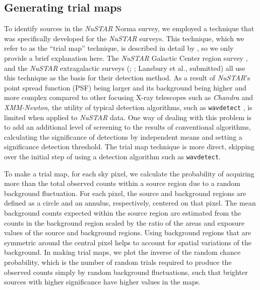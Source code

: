 \documentclass[iop,revtex4]{emulateapj}
\begin{document}
\subsection{Generating trial maps}
To identify sources in the \textit{NuSTAR} Norma survey, we employed a technique that was specifically developed for the \textit{NuSTAR} surveys.  This technique, which we refer to as the ``trial map'' technique, is described in detail by \citet{hong16}, so we only provide a brief explanation here.  The \textit{NuSTAR} Galactic Center region survey \citep{hong16}, and the \textit{NuSTAR} extragalactic surveys (\citealt{civano15}; \citealt{mullaney15}; Lansbury et al., submitted) all use this technique as the basis for their detection method.    
As a result of \textit{NuSTAR}'s point spread function (PSF) being larger and its background being higher and more complex compared to other focusing X-ray telescopes such as \textit{Chandra} and \textit{XMM-Newton}, the utility of typical detection algorithms, such as \texttt{wavdetect} \citep{freeman02}, is limited when applied to \textit{NuSTAR} data.  One way of dealing with this problem is to add an additional level of screening to the results of conventional algorithms, calculating the significance of detections by independent means and setting a significance detection threshold.  The trial map technique is more direct, skipping over the initial step of using a detection algorithm such as \texttt{wavdetect}. \par
To make a trial map, for each sky pixel, we calculate the probability of acquiring more than the total observed counts within a source region due to a random background fluctuation.  For each pixel, the source and background regions are defined as a circle and an annulus, respectively, centered on that pixel.  The mean background counts expected within the source region are estimated from the counts in the background region scaled by the ratio of the areas and exposure values of the source and background regions.  Using background regions that are symmetric around the central pixel helps to account for spatial variations of the background.  In making trial maps, we plot the inverse of the random chance probability, which is the number of random trials required to produce the observed counts simply by random background fluctuations, such that brighter sources with higher significance have higher values in the maps.  \par
\end{document}
